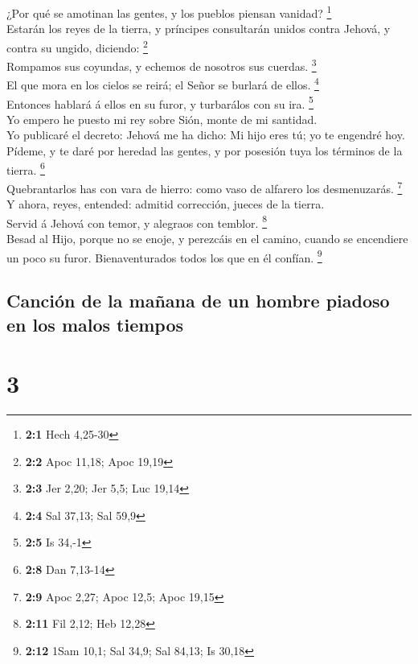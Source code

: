  ¿Por qué se amotinan las gentes, y los pueblos piensan
vanidad? \footnote{\textbf{2:1} Hech 4,25-30}\\
 Estarán los reyes de la tierra, y príncipes consultarán
unidos contra Jehová, y contra su ungido, diciendo: \footnote{\textbf{2:2}
  Apoc 11,18; Apoc 19,19}\\
 Rompamos sus coyundas, y echemos de nosotros sus cuerdas.
\footnote{\textbf{2:3} Jer 2,20; Jer 5,5; Luc 19,14}\\
 El que mora en los cielos se reirá; el Señor se burlará de
ellos. \footnote{\textbf{2:4} Sal 37,13; Sal 59,9}\\
 Entonces hablará á ellos en su furor, y turbarálos con su
ira. \footnote{\textbf{2:5} Is 34,-1}\\
 Yo empero he puesto mi rey sobre Sión, monte de mi
santidad.\\
 Yo publicaré el decreto: Jehová me ha dicho: Mi hijo eres
tú; yo te engendré hoy.\\
 Pídeme, y te daré por heredad las gentes, y por posesión
tuya los términos de la tierra. \footnote{\textbf{2:8} Dan 7,13-14}\\
 Quebrantarlos has con vara de hierro: como vaso de alfarero
los desmenuzarás. \footnote{\textbf{2:9} Apoc 2,27; Apoc 12,5; Apoc
  19,15}\\
 Y ahora, reyes, entended: admitid corrección, jueces de la
tierra.\\
 Servid á Jehová con temor, y alegraos con temblor.
\footnote{\textbf{2:11} Fil 2,12; Heb 12,28}\\
 Besad al Hijo, porque no se enoje, y perezcáis en el
camino, cuando se encendiere un poco su furor. Bienaventurados todos los
que en él confían. \footnote{\textbf{2:12} 1Sam 10,1; Sal 34,9; Sal
  84,13; Is 30,18}

\hypertarget{canciuxf3n-de-la-mauxf1ana-de-un-hombre-piadoso-en-los-malos-tiempos}{%
\subsection{Canción de la mañana de un hombre piadoso en los malos
tiempos}\label{canciuxf3n-de-la-mauxf1ana-de-un-hombre-piadoso-en-los-malos-tiempos}}

\hypertarget{section-2}{%
\section{3}\label{section-2}}

